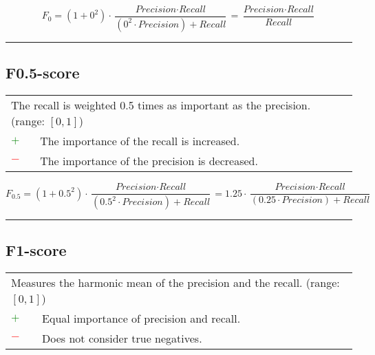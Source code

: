 \documentclass{article}
\begin{document}
\begin{equation}
	F_0 = (1 + 0^2) \cdot \dfrac{\textit{Precision} \cdot \textit{Recall}}{(0^2 \cdot \textit{Precision}) + \textit{Recall}} = \dfrac{\textit{Precision} \cdot \textit{Recall}}{\textit{Recall}}
%
	\label{equation:F0-score}
\end{equation}

\hrule


\subsection[F0.5-score]{F0.5-score \cite{van2004geometry, taha2015metrics}}

\begin{table}[H]\centering
	\begin{tabular}{m{}m{}}
		\multicolumn{2}{m{0.95\textwidth}}{The recall is weighted 0.5 times as important as the precision. (range: $[0, 1]$)} \\
		\textcolor{Green}{$+$} & The importance of the recall is increased. \\
		\textcolor{Red}{$-$}   & The importance of the precision is decreased.
	\end{tabular}
\end{table}

\begin{equation}
	F_{0.5} = (1 + 0.5^2) \cdot \dfrac{\textit{Precision} \cdot \textit{Recall}}{(0.5^2 \cdot \textit{Precision}) + \textit{Recall}} = 1.25 \cdot \dfrac{\textit{Precision} \cdot \textit{Recall}}{(0.25 \cdot \textit{Precision}) + \textit{Recall}}
%
	\label{equation:F0.5-score}
\end{equation}

\hrule


\subsection[F1-score]{F1-score \cite{van2004geometry, taha2015metrics}}

\begin{table}[H]\centering
	\begin{tabular}{m{}m{}}
		\multicolumn{2}{m{0.95\textwidth}}{Measures the harmonic mean of the precision and the recall. (range: $[0, 1]$)} \\
		\textcolor{Green}{$+$} & Equal importance of precision and recall. \\
		\textcolor{Red}{$-$}   & Does not consider true negatives.
	\end{tabular}
\end{table}
\end{document}
